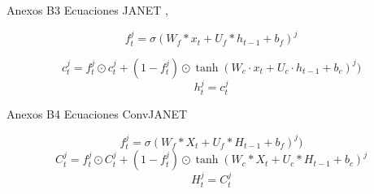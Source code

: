 \documentclass[aspectratio=169]{beamer}
\begin{document}
\begin{frame}{Anexos B3}
Ecuaciones JANET \cite{janet},
\begin{enumerate}
    \begin{equation}
        f_{t}^{j}= \sigma (W_{f}*{x_{t}} + U_{f}*{h_{t-1}} + b_{f})^{j}
    \end{equation}

    \begin{equation}
         {c}_{t}^{j}= f_{t}^{j}\odot{c_{t}^{j}} + (1 - f_{t}^{j})\odot{\tanh(W_{c}\cdot{x_{t}} + U_{c}\cdot{h_{t-1}} + b_{c})^{j})}
    \end{equation}
    \begin{equation}
        {h}_{t}^{j}= {c}_{t}^{j}
    \end{equation}
    
\end{enumerate}
\end{frame}

\begin{frame}{Anexos B4}
Ecuaciones ConvJANET

\begin{enumerate}
    \begin{equation}
        f_{t}^{j}= \sigma (W_{f}*{X_{t}} + U_{f}*{H_{t-1}} + b_{f})^{j})
    \end{equation}
    \begin{equation}
         {C}_{t}^{j}= f_{t}^{j}\odot{C_{t}^{j}} + (1 - f_{t}^{j})\odot{\tanh{ (W_{c}*{X_{t}} + U_{c}*{H_{t-1}} + b_{c})^{j} } }
    \end{equation}
    \begin{equation}
        {H}_{t}^{j}= {C}_{t}^{j}
    \end{equation}
    
\end{enumerate}
\end{frame}
\end{document}
